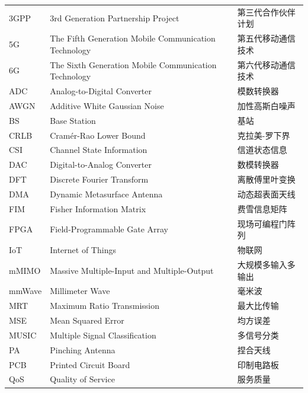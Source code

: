 \begin{longtable}{p{2.3cm}p{7cm}p{4cm}}
	3GPP   & 3rd Generation Partnership Project               & 第三代合作伙伴计划  \\
	5G     & The Fifth Generation Mobile Communication Technology & 第五代移动通信技术  \\
	6G     & The Sixth Generation Mobile Communication Technology & 第六代移动通信技术  \\
	ADC    & Analog-to-Digital Converter                      & 模数转换器    \\
	AWGN   & Additive White Gaussian Noise                    & 加性高斯白噪声    \\
	BS     & Base Station                                     & 基站         \\
	CRLB   & Cram\'er-Rao Lower Bound                         & 克拉美-罗下界 \\
	CSI    & Channel State Information                        & 信道状态信息     \\
	DAC    & Digital-to-Analog Converter                      & 数模转换器    \\
	DFT    & Discrete Fourier Transform                       & 离散傅里叶变换    \\
	DMA    & Dynamic Metasurface Antenna                      & 动态超表面天线    \\
	FIM    & Fisher Information Matrix                        & 费雪信息矩阵   \\
	FPGA   & Field-Programmable Gate Array                    & 现场可编程门阵列 \\
	IoT    & Internet of Things                               & 物联网        \\
	mMIMO  & Massive Multiple-Input and Multiple-Output       & 大规模多输入多输出   \\
	mmWave & Millimeter Wave                                  & 毫米波        \\
	MRT    & Maximum Ratio Transmission                       & 最大比传输      \\
	MSE    & Mean Squared Error                               & 均方误差       \\
	MUSIC  & Multiple Signal Classification                   & 多信号分类      \\
	PA     & Pinching Antenna                                 & 捏合天线       \\
	PCB    & Printed Circuit Board                            & 印制电路板      \\
	QoS    & Quality of Service                               & 服务质量       \\

\end{longtable}
